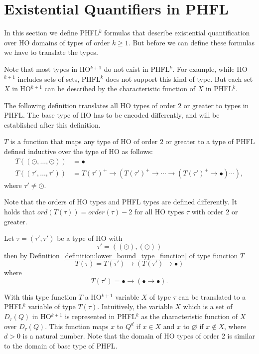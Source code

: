 

\section{Existential Quantifiers in PHFL}\label{sec:existential_quantifiers_in_phfl}

In this section we define PHFL$^{k}$ formulas that describe existential quantification over HO domains of types of
order $k \geq 1$. But before we can define these formulas we have to translate the types.


Note that most types in HO$^{k + 1}$ do not exist in PHFL$^k$. For example, while HO$^{k +
1}$ includes sets of sets, PHFL$^k$ does not support this kind of type.
But each set $X$ in HO$^{k+1}$ can be described by the characteristic function of $X$ in PHFL$^k$.

The following definition translates all HO types of order $2$ or greater to types in PHFL. The base type of HO
has to be encoded differently, and will be established after this definition.

\begin{definition}
    \label{definition:lower_bound_type_function}
    $T$ is a function that maps any type of HO of order $2$ or greater to a type of PHFL defined inductive over the
    type of HO as follows:
    \begin{align*}
        T((\odot, \dots, \odot)) &= \bullet\\
        T((\tau', \dots, \tau')) &= T(\tau')^+ \rightarrow (T(\tau')^+ \rightarrow \dotsb \rightarrow (T(\tau')^+
        \rightarrow \bullet) \dotsb ),
    \end{align*}
    where $\tau' \neq \odot$.
\end{definition}

Note that the orders of HO types and PHFL types are defined differently. It holds that $ord(T(\tau)) = order(\tau) - 2$
for all HO types $\tau$ with order $2$ or greater.

\begin{example}
    Let $\tau = (\tau', \tau')$ be a type of HO with
    \[\tau' = ((\odot), (\odot))\]
    then by Definition~\ref{definition:lower_bound_type_function} of type function $T$
    \[T(\tau) = T(\tau') \rightarrow (T(\tau') \rightarrow \bullet)\]
    where
    \[T(\tau') = \bullet \rightarrow (\bullet \rightarrow \bullet).\]
\end{example}

With this type function $T$ a HO$^{k + 1}$ variable $X$ of type $\tau$ can be translated to a PHFL$^k$ variable
of type $T(\tau)$. Intuitively, the variable $X$ which is a set of $D_\tau(Q)$ in HO$^{k+1}$ is represented
in PHFL$^k$ as the characteristic function of $X$ over $D_\tau(Q)$. This function maps $x$ to $Q^d$ if $x \in X$ and $x$ to $\varnothing$ if $x\not\in X$, where $d > 0$ is a natural number. Note that the domain of HO types
of order $2$ is similar to the domain of base type of PHFL.

